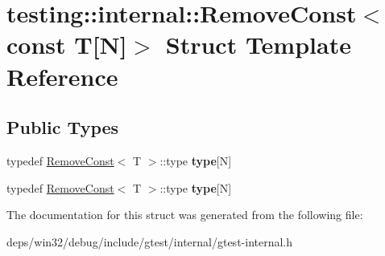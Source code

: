 \hypertarget{structtesting_1_1internal_1_1_remove_const_3_01const_01_t[_n]_4}{}\section{testing\+:\+:internal\+:\+:Remove\+Const$<$ const T\mbox{[}N\mbox{]}$>$ Struct Template Reference}
\label{structtesting_1_1internal_1_1_remove_const_3_01const_01_t[_n]_4}
\subsection*{Public Types}
\begin{DoxyCompactItemize}
\item 
\hypertarget{structtesting_1_1internal_1_1_remove_const_3_01const_01_t[_n]_4_ac976b53cb5d031a120fafbe790650068}{}typedef \hyperlink{structtesting_1_1internal_1_1_remove_const}{Remove\+Const}$<$ T $>$\+::type {\bfseries type}\mbox{[}N\mbox{]}\label{structtesting_1_1internal_1_1_remove_const_3_01const_01_t[_n]_4_ac976b53cb5d031a120fafbe790650068}

\item 
\hypertarget{structtesting_1_1internal_1_1_remove_const_3_01const_01_t[_n]_4_ac976b53cb5d031a120fafbe790650068}{}typedef \hyperlink{structtesting_1_1internal_1_1_remove_const}{Remove\+Const}$<$ T $>$\+::type {\bfseries type}\mbox{[}N\mbox{]}\label{structtesting_1_1internal_1_1_remove_const_3_01const_01_t[_n]_4_ac976b53cb5d031a120fafbe790650068}

\end{DoxyCompactItemize}


The documentation for this struct was generated from the following file\+:\begin{DoxyCompactItemize}
\item 
deps/win32/debug/include/gtest/internal/gtest-\/internal.\+h\end{DoxyCompactItemize}
